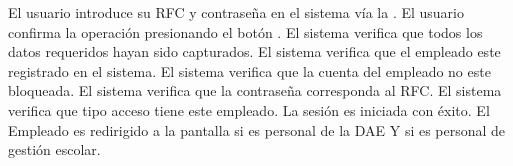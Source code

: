 	\begin{UCtrayectoria}
	\UCpaso[\UCactor] El usuario introduce su RFC y contraseña en el sistema vía la  \label{CU41.introduceDatos}.
	\UCpaso[\UCactor] El usuario confirma la operación presionando el botón .
	\UCpaso El sistema verifica que todos los datos requeridos hayan sido capturados.
	\UCpaso El sistema verifica que el empleado este registrado en el sistema.
	\UCpaso El sistema verifica que la cuenta del empleado no este bloqueada.
	\UCpaso El sistema verifica que la contraseña corresponda al RFC.
	\UCpaso El sistema verifica que tipo acceso tiene este empleado.
	\UCpaso La sesión es iniciada con éxito.
	\UCpaso El Empleado es redirigido a la pantalla  si es personal de la DAE Y  si es personal de gestión escolar.
	
\end{UCtrayectoria}






